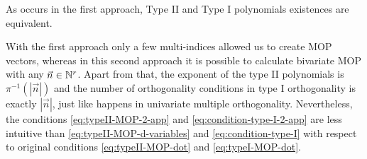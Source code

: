 \documentclass[portrait,final,a0paper,fontscale=0.38]{baposter}
\begin{document}
\begin{poster}
{  As occurs in the first approach, Type II and Type I polynomials existences are equivalent.%
%
%  

  With the first approach only a few multi-indices allowed us to create MOP vectors, whereas in this second approach it is possible to calculate bivariate MOP with any $\vec n\in\mathbb{N}^r$. Apart from that, the exponent of the type II polynomials is $\pi^{-1}(|\vec n|)$ and the number of orthogonality conditions in type I orthogonality is exactly $|\vec n|$, just like happens in univariate multiple orthogonality. Nevertheless, the conditions \eqref{eq:typeII-MOP-2-app} and \eqref{eq:condition-type-I-2-app} are less intuitive than \eqref{eq:typeII-MOP-d-variables} and \eqref{eq:condition-type-I} with respect to original conditions \eqref{eq:typeII-MOP-dot} and \eqref{eq:typeI-MOP-dot}.


\vspace{2pt}

}
%



\end{poster}
\end{document}
